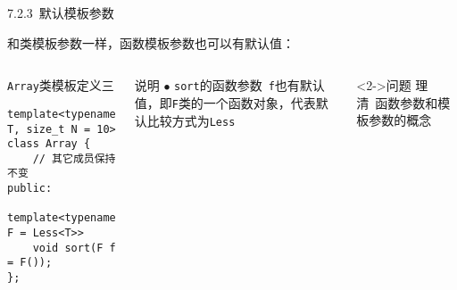 \begin{frame}[fragile]{7.2.3~默认模板参数}

和\alert{类模板参数}一样，\alert{函数模板参数}也可以有默认值：

\vspace{-4mm}

\begin{columns}[t]

\begin{blueblock}{\texttt{Array}类模板定义三}
\vspace{-1mm}\begin{lstlisting}[moreemph={Array,T,Less,F}]
template<typename T, size_t N = 10>
class Array {
    // 其它成员保持不变
public:
    template<typename F = Less<T>>
    void sort(F f = F());
};
\end{lstlisting}\vspace{-1mm}
\end{blueblock}

\begin{yellowblock}{说明}
$\bullet$ \texttt{sort}的\alert{函数参数}~\texttt{f}也有默认值，即\texttt{F}类的一个函数对象，代表默认比较方式为\texttt{Less}
\end{yellowblock}
\begin{greenblock}<2->{问题}
理清~\alert{函数参数}和\alert{模板参数}的概念
\end{greenblock}

\end{columns}

\end{frame}



